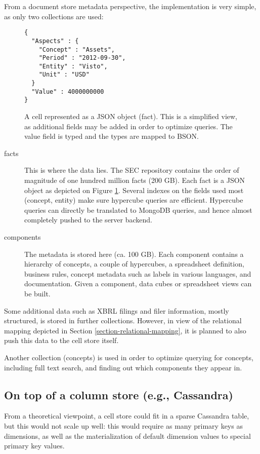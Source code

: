 \documentclass{acm_proc_article-sp}
\begin{document}
From a document store metadata perspective, the implementation is very simple, as only two collections are used:


\begin{figure}
\begin{lstlisting}
{
  "Aspects" : {
    "Concept" : "Assets",
    "Period" : "2012-09-30",
    "Entity" : "Visto",
    "Unit" : "USD"
  }
  "Value" : 4000000000
}
\end{lstlisting}
\caption{A cell represented as a JSON object (fact). This is a simplified view, as additional fields may be added in order to optimize queries. The value field is typed and the types are mapped to BSON.}
\label{fig-fact}
\end{figure}


\begin{description}
\item[facts] This is where the data lies. The SEC repository \cite{SECXBRL.info} contains the order of magnitude of one hundred million facts (200 GB). Each fact is a JSON object as depicted on Figure \ref{fig-fact}. Several indexes on the fields used most (concept, entity) make sure hypercube queries are efficient. Hypercube queries can directly be translated to MongoDB queries, and hence almost completely pushed to the server backend.
\item[components] The metadata is stored here (ca. 100 GB). Each component contains a hierarchy of concepts, a couple of hypercubes, a spreadsheet definition, business rules, concept metadata such as labels in various languages, and documentation. Given a component, data cubes or spreadsheet views can be built.
\end{description}

Some additional data such as XBRL filings and filer information, mostly structured, is stored in further collections. However, in view of the relational mapping depicted in Section \ref{section-relational-mapping}, it is planned to also push this data to the cell store itself.

Another collection (concepts) is used in order to optimize querying for concepts, including full text search, and finding out which components they appear in.

\subsection{On top of a column store (e.g., Cassandra)}

From a theoretical viewpoint, a cell store could fit in a sparse Cassandra table, but this would not scale up well: this would require as many primary keys as dimensions, as well as the materialization of default dimension values to special primary key values.
\end{document}
